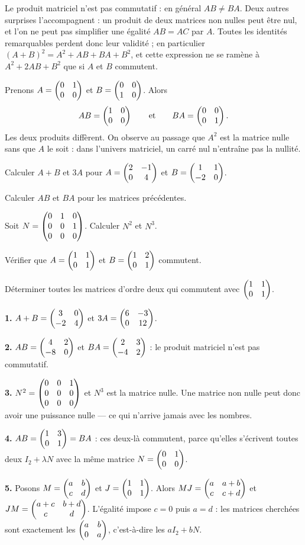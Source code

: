 \begin{avertissement}
Le produit matriciel n'est pas commutatif : en général $AB \neq BA$. Deux
autres surprises l'accompagnent : un produit de deux matrices non nulles peut
être nul, et l'on ne peut pas simplifier une égalité $AB = AC$ par $A$. Toutes
les identités remarquables perdent donc leur validité ; en particulier
$(A+B)^{2} = A^{2}+AB+BA+B^{2}$, et cette expression ne se ramène à
$A^{2}+2AB+B^{2}$ que si $A$ et $B$ commutent.
\end{avertissement}

\begin{exemple}
Prenons $A = \begin{pmatrix} 0 & 1 \\ 0 & 0 \end{pmatrix}$ et $B = \begin{pmatrix} 0 & 0 \\ 1 & 0 \end{pmatrix}$. Alors
\[
  AB = \begin{pmatrix} 1 & 0 \\ 0 & 0 \end{pmatrix}
  \qquad\text{et}\qquad
  BA = \begin{pmatrix} 0 & 0 \\ 0 & 1 \end{pmatrix}.
\]
Les deux produits diffèrent. On observe au passage que $A^{2}$ est la matrice
nulle sans que $A$ le soit : dans l'univers matriciel, un carré nul
n'entraîne pas la nullité.
\end{exemple}

\begin{entrainement}
\exo[\niveau{1}] Calculer $A+B$ et $3A$ pour
$A = \begin{pmatrix} 2 & -1 \\ 0 & 4 \end{pmatrix}$ et $B = \begin{pmatrix} 1 & 1 \\ -2 & 0 \end{pmatrix}$.

\exo[\niveau{1}] Calculer $AB$ et $BA$ pour les matrices précédentes.

\exo[\niveau{2}] Soit $N = \begin{pmatrix} 0 & 1 & 0 \\ 0 & 0 & 1 \\ 0 & 0 & 0 \end{pmatrix}$. Calculer
$N^{2}$ et $N^{3}$.

\exo[\niveau{2}] Vérifier que $A = \begin{pmatrix} 1 & 1 \\ 0 & 1 \end{pmatrix}$ et
$B = \begin{pmatrix} 1 & 2 \\ 0 & 1 \end{pmatrix}$ commutent.

\exo[\niveau{3}] Déterminer toutes les matrices d'ordre deux qui commutent
avec $\begin{pmatrix} 1 & 1 \\ 0 & 1 \end{pmatrix}$.
\end{entrainement}

\begin{corrige}
\textbf{1.} $A+B = \begin{pmatrix} 3 & 0 \\ -2 & 4 \end{pmatrix}$ et
$3A = \begin{pmatrix} 6 & -3 \\ 0 & 12 \end{pmatrix}$.

\textbf{2.} $AB = \begin{pmatrix} 4 & 2 \\ -8 & 0 \end{pmatrix}$ et $BA = \begin{pmatrix} 2 & 3 \\ -4 & 2 \end{pmatrix}$ :
le produit matriciel n'est pas commutatif.

\textbf{3.} $N^{2} = \begin{pmatrix} 0 & 0 & 1 \\ 0 & 0 & 0 \\ 0 & 0 & 0 \end{pmatrix}$ et
$N^{3}$ est la matrice nulle. Une matrice non nulle peut donc avoir une
puissance nulle — ce qui n'arrive jamais avec les nombres.

\textbf{4.} $AB = \begin{pmatrix} 1 & 3 \\ 0 & 1 \end{pmatrix} = BA$ : ces deux-là commutent, parce
qu'elles s'écrivent toutes deux $I_{2}+\lambda N$ avec la même matrice
$N = \begin{pmatrix} 0 & 1 \\ 0 & 0 \end{pmatrix}$.

\textbf{5.} Posons $M = \begin{pmatrix} a & b \\ c & d \end{pmatrix}$ et $J = \begin{pmatrix} 1 & 1 \\ 0 & 1 \end{pmatrix}$.
Alors $MJ = \begin{pmatrix} a & a+b \\ c & c+d \end{pmatrix}$ et $JM = \begin{pmatrix} a+c & b+d \\ c & d \end{pmatrix}$.
L'égalité impose $c = 0$ puis $a = d$ : les matrices cherchées sont exactement
les $\begin{pmatrix} a & b \\ 0 & a \end{pmatrix}$, c'est-à-dire les $aI_{2}+bN$.
\end{corrige}

